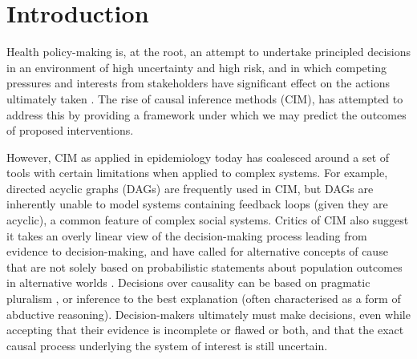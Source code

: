 \documentclass[review]{elsarticle}
\begin{document}
\linenumbers

\section{Introduction}



Health policy-making is, at the root, an attempt to undertake principled decisions in an environment of high uncertainty and high risk, and in which competing pressures and interests from stakeholders have significant effect on the actions ultimately taken \citep{oliver2014}.  The rise of causal inference methods (CIM), has attempted to address this by providing a framework under which we may predict the outcomes of proposed interventions.  

However, CIM as applied in epidemiology today has coalesced around a set of tools with certain limitations when applied to complex systems.  For example, directed acyclic graphs (DAGs) are frequently used in CIM, but DAGs are inherently unable to model systems containing feedback loops (given they are acyclic), a common feature of complex social systems.  Critics of CIM also suggest it takes an overly linear view of the decision-making process leading from evidence to decision-making, and have called for alternative concepts of cause that are not solely based on probabilistic statements about population outcomes in alternative worlds \citep{krieger2016}. Decisions over causality can be based on pragmatic pluralism \citep{vandenbroucke2016}, or inference to the best explanation \citep{lipton2003,krieger2016} (often characterised as a form of abductive reasoning).  Decision-makers ultimately must make decisions, even while accepting that their evidence is incomplete or flawed or both, and that the exact causal process underlying the system of interest is still uncertain.
\end{document}
